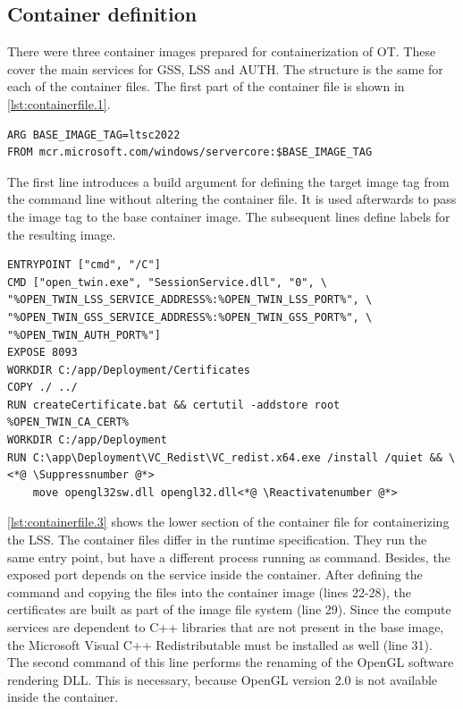 \subsection{Container definition}
There were three container images prepared for containerization of \ac{OT}. These cover the main services for \ac{GSS}, \ac{LSS} and \ac{AUTH}. The structure is the same for each of the container files. The first part of the container file is shown in \autoref{lst:containerfile.1}.
\begin{lstlisting}[label=lst:containerfile.1, caption={Containerfile for the \ac{LSS}. Description of the base image and variable tagging using a build argument. (\textit{Distribution/Container/session.Containerfile})}, language=docker, firstnumber=1]
ARG BASE_IMAGE_TAG=ltsc2022
FROM mcr.microsoft.com/windows/servercore:$BASE_IMAGE_TAG
\end{lstlisting}
The first line introduces a build argument for defining the target image tag from the command line without altering the container file.  It is used afterwards to pass the image tag to the base container image. The subsequent lines define labels for the resulting image.
\vspace{1em}
\begin{lstlisting}[label=lst:containerfile.3, caption={Containerfile for the \ac{GSS}. Description of the command line and certificate creation. (\textit{Distribution/Container/session.Containerfile})}, language=docker, firstnumber=21]
ENTRYPOINT ["cmd", "/C"]
CMD ["open_twin.exe", "SessionService.dll", "0", \
"%OPEN_TWIN_LSS_SERVICE_ADDRESS%:%OPEN_TWIN_LSS_PORT%", \
"%OPEN_TWIN_GSS_SERVICE_ADDRESS%:%OPEN_TWIN_GSS_PORT%", \
"%OPEN_TWIN_AUTH_PORT%"]
EXPOSE 8093
WORKDIR C:/app/Deployment/Certificates
COPY ./ ../
RUN createCertificate.bat && certutil -addstore root %OPEN_TWIN_CA_CERT%
WORKDIR C:/app/Deployment
RUN C:\app\Deployment\VC_Redist\VC_redist.x64.exe /install /quiet && \<*@ \Suppressnumber @*>
    move opengl32sw.dll opengl32.dll<*@ \Reactivatenumber @*>
\end{lstlisting}
\autoref{lst:containerfile.3} shows the lower section of the container file for containerizing the \ac{LSS}.
The container files differ in the runtime specification. They run the same entry point, but have a different process running as command. Besides, the exposed port depends on the service inside the container. 
After defining the command and copying the files into the container image (lines 22-28), the certificates are built as part of the image file system (line 29).
Since the compute services are dependent to C++ libraries that are not present in the base image, the Microsoft Visual C++ Redistributable must be installed as well (line 31).
The second command of this line performs the renaming of the OpenGL software rendering \ac{DLL}. This is necessary, because OpenGL version 2.0 is not available inside the container.

